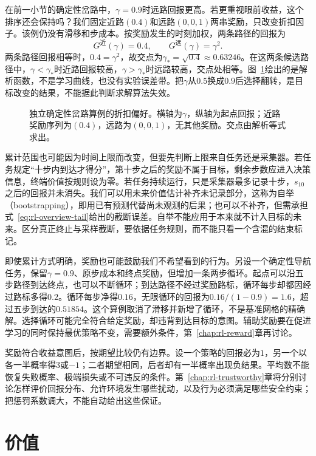 在前一小节的确定性岔路中，$\gamma=0.9$时远路回报更高。若更重视眼前收益，这个排序还会保持吗？我们固定近路$(0.4)$和远路$(0,0,1)$两串奖励，只改变折扣因子。该例仍没有滑移和步成本。按奖励发生的时刻加权，两条路径的回报为
\[
  G^{\text{近}}(\gamma)=0.4,\qquad
  G^{\text{远}}(\gamma)=\gamma^2.
\]
两条路径回报相等时，$0.4=\gamma^2$，故交点为$\gamma_*=\sqrt{0.4}\approx0.63246$。在这两条候选路径中，$\gamma<\gamma_*$时近路回报较高，$\gamma>\gamma_*$时远路较高，交点处相等。图~\ref{fig:rl-overview-discount}绘出的是解析函数，不是学习曲线，也没有实验误差带。把$\gamma$从$0.5$换成$0.9$后选择翻转，是目标改变的结果，不能据此判断求解算法失效。

\begin{figure}[htbp]
  \centering
  
  \caption{独立确定性岔路算例的折扣偏好。横轴为$\gamma$，纵轴为起点回报；近路奖励序列为$(0.4)$，远路为$(0,0,1)$，无其他奖励。交点由解析等式求出。}
  \label{fig:rl-overview-discount}
\end{figure}

累计范围也可能因为时间上限而改变，但要先判断上限来自任务还是采集器。若任务规定“十步内到达才得分”，第十步之后的奖励不属于目标，剩余步数应进入决策信息，终端价值按规则设为零。若任务持续运行，只是采集器最多记录十步，$s_{10}$之后的回报并未消失。我们可以用未来价值估计补齐未记录部分，这称为自举（bootstrapping），即用已有预测代替尚未观测的后果；也可以不补齐，但需承担式~\eqref{eq:rl-overview-tail}给出的截断误差。自举不能应用于本来就不计入目标的未来。区分真正终止与采样截断，要依据任务规则，而不能只看一个含混的结束标记。

即使累计方式明确，奖励也可能鼓励我们不希望看到的行为。另设一个确定性导航任务，保留$\gamma=0.9$、原步成本和终点奖励，但增加一条两步循环。起点可以沿五步路径到达终点，也可以不断循环；到达路径不经过奖励路标，循环每步却都因经过路标多得$0.2$。循环每步净得$0.16$，无限循环的回报为$0.16/(1-0.9)=1.6$，超过五步到达的$0.51854$。这个算例取消了滑移并新增了循环，不是基准网格的精确解。选择循环可能完全符合给定奖励，却违背到达目标的意图。辅助奖励要在促进学习的同时保持最优策略不变，需要额外条件，第~\ref{chap:rl-reward}章再讨论。

奖励符合收益意图后，按期望比较仍有边界。设一个策略的回报必为$1$，另一个以各一半概率得$3$或$-1$；二者期望相同，后者却有一半概率出现负结果。平均数不能恢复失败概率、极端损失或不可违反的条件。第~\ref{chap:rl-trustworthy}章将分别讨论怎样评价回报分布、允许环境发生哪些扰动，以及行为必须满足哪些安全约束；把惩罚系数调大，不能自动给出这些保证。

\section{价值}
\label{sec:rl-overview-values}

